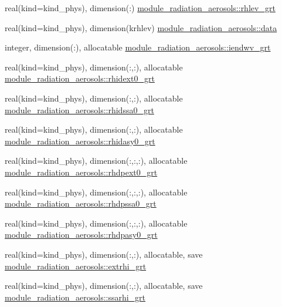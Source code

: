 \begin{DoxyCompactItemize}
\item 
real(kind=kind\+\_\+phys), dimension(\+:) \hyperlink{group__module__radiation__aerosols_gace40d50e36de1fc08c4ff35f6d8dbda9}{module\+\_\+radiation\+\_\+aerosols\+::rhlev\+\_\+grt}
\item 
real(kind=kind\+\_\+phys), dimension(krhlev) \hyperlink{group__module__radiation__aerosols_ga1248e740e53498ed7a06f7d475b1fb25}{module\+\_\+radiation\+\_\+aerosols\+::data}
\item 
integer, dimension(\+:), allocatable \hyperlink{group__module__radiation__aerosols_gac755c4235327053fff060ffa3b2ee2a3}{module\+\_\+radiation\+\_\+aerosols\+::iendwv\+\_\+grt}
\item 
real(kind=kind\+\_\+phys), dimension(\+:,\+:), allocatable \hyperlink{group__module__radiation__aerosols_ga6683021bded82850053c16eb3e906998}{module\+\_\+radiation\+\_\+aerosols\+::rhidext0\+\_\+grt}
\item 
real(kind=kind\+\_\+phys), dimension(\+:,\+:), allocatable \hyperlink{group__module__radiation__aerosols_gaea46db63db26a316e73640bc63f75383}{module\+\_\+radiation\+\_\+aerosols\+::rhidssa0\+\_\+grt}
\item 
real(kind=kind\+\_\+phys), dimension(\+:,\+:), allocatable \hyperlink{group__module__radiation__aerosols_ga8491a714c86e9bd7ebdc401662f5068e}{module\+\_\+radiation\+\_\+aerosols\+::rhidasy0\+\_\+grt}
\item 
real(kind=kind\+\_\+phys), dimension(\+:,\+:,\+:), allocatable \hyperlink{group__module__radiation__aerosols_ga35a5c7b67a3cf11c5016a693e115d384}{module\+\_\+radiation\+\_\+aerosols\+::rhdpext0\+\_\+grt}
\item 
real(kind=kind\+\_\+phys), dimension(\+:,\+:,\+:), allocatable \hyperlink{group__module__radiation__aerosols_ga40d680662eadf30221997dadcce734b1}{module\+\_\+radiation\+\_\+aerosols\+::rhdpssa0\+\_\+grt}
\item 
real(kind=kind\+\_\+phys), dimension(\+:,\+:,\+:), allocatable \hyperlink{group__module__radiation__aerosols_gab5a0bbefbfed6b393f0abad26e6e4d04}{module\+\_\+radiation\+\_\+aerosols\+::rhdpasy0\+\_\+grt}
\item 
real(kind=kind\+\_\+phys), dimension(\+:,\+:), allocatable, save \hyperlink{group__module__radiation__aerosols_gacb7ff037be78e950ea42d956816c93d5}{module\+\_\+radiation\+\_\+aerosols\+::extrhi\+\_\+grt}
\item 
real(kind=kind\+\_\+phys), dimension(\+:,\+:), allocatable, save \hyperlink{group__module__radiation__aerosols_gae8587d9b4ebd9cf5d363a82d15049324}{module\+\_\+radiation\+\_\+aerosols\+::ssarhi\+\_\+grt}

\end{DoxyCompactItemize}
